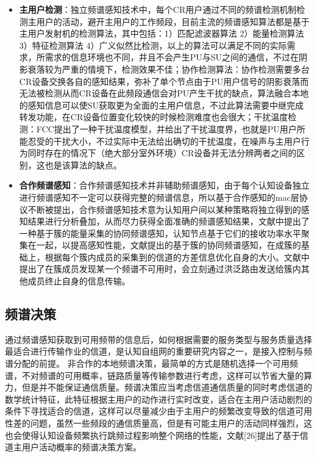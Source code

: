 \documentclass[a4paper,AutoFakeBold,oneside,12pt]{book}
\begin{document}
  \begin{itemize}
\item  \textbf{主用户检测}：独立频谱感知技术中，每个CR用户通过不同的频谱检测机制检测主用户的活动，避开主用户的工作频段，目前主流的频谱感知算法都是基于主用户发射机的检测算法，其中包括：1）匹配滤波器算法 2）能量检测算法\cite{uapp} 3）特征检测算法\cite{pinpu} 4）广义似然比检测，以上的算法可以满足不同的实际需求，所需求的信息环境也不同，并且不会产生PU与SU之间的通信，不过在阴影衰落较为严重的情境下，检测效果不佳；协作检测算法：协作检测需要多台CR设备交换各自的感知结果，弥补了单个节点由于PU用户信号的阴影衰落而无法被检测从而CR设备在此频段通信会对PU产生干扰的缺点，算法融合本地的感知信息可以使SU获取更为全面的主用户信息，不过此算法需要中继完成转发功能，在CR设备位置变化较快的时候检测难度也会很大；干扰温度检测：FCC提出了一种干扰温度模型，并给出了干扰温度界，也就是PU用户所能忍受的干扰大小，不过实际中无法给出确切的干扰温度，在噪声与主用户行为同时存在的情况下（绝大部分室外环境）CR设备并无法分辨两者之间的区别，这也是该算法的缺点。
\item \textbf{合作频谱感知}：合作频谱感知技术并非辅助频谱感知，由于每个认知设备独立进行频谱感知不一定可以获得完整的频谱信息，所以基于合作感知的mac层协议不断被提出，合作频谱感知技术意为认知用户间以某种策略将独立得到的感知结果进行分析叠加，从而尽力获得全面准确的频谱感知结果，文献\cite{uaQQ}中提出了一种基于簇的能量采集的协同频谱感知，认知节点基于它们的接收功率水平聚集在一起，以提高感知性能，文献\cite{Peipei}提出的基于簇的协同频谱感知，在成簇的基础上，根据每个簇内成员的采集到的信道的方差信息优化自身的大小。文献\cite{hezuo}中提出了在簇成员发现某一个频谱不可用时，会立刻通过洪泛路由发送给簇内其他成员终止自身的信息传输。
\end{itemize}
\subsection{频谱决策}
  通过频谱感知获取到可用频带的信息后，如何根据需要的服务类型与服务质量选择最适合进行传输作业的信道，是认知自组网的重要研究内容之一，是接入控制与频谱分配的前提。
  非合作的本地频谱决策，最简单的方式是随机选择一个可用频谱，不对频谱的可用概率，链路质量等传输参数进行考虑，这样可以节省大量的算力，但是并不能保证通信质量。频谱决策应当考虑信道通信质量的同时考虑信道的数学统计特征，此特征根据主用户的动作进行实时改变，适合在主用户活动剧烈的条件下寻找适合的信道，这样可以尽量减少由于主用户的频繁改变导致的信道可用性差的问题，虽然一些频段的通信质量高，但是有可能主用户的活动同样强烈，这也会使得认知设备频繁执行跳频过程影响整个网络的性能，文献[26]提出了基于信道主用户活动概率的频谱决策方案。
\end{document}
